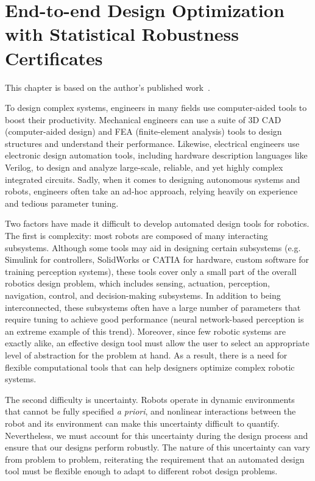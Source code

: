 \chapter{End-to-end Design Optimization with Statistical Robustness Certificates}\label{ch:rss}

This chapter is based on the author's published work~\cite{dawsonCertifiableRobotDesign2022}.

To design complex systems, engineers in many fields use computer-aided tools to boost their productivity. Mechanical engineers can use a suite of 3D CAD (computer-aided design) and FEA (finite-element analysis) tools to design structures and understand their performance. Likewise, electrical engineers use electronic design automation tools, including hardware description languages like Verilog, to design and analyze large-scale, reliable, and yet highly complex integrated circuits. Sadly, when it comes to designing autonomous systems and robots, engineers often take an ad-hoc approach, relying heavily on experience and tedious parameter tuning.

Two factors have made it difficult to develop automated design tools for robotics. The first is complexity: most robots are composed of many interacting subsystems. Although some tools may aid in designing certain subsystems (e.g. Simulink for controllers, SolidWorks or CATIA for hardware, custom software for training perception systems), these tools cover only a small part of the overall robotics design problem, which includes sensing, actuation, perception, navigation, control, and decision-making subsystems. In addition to being interconnected, these subsystems often have a large number of parameters that require tuning to achieve good performance (neural network-based perception is an extreme example of this trend). Moreover, since few robotic systems are exactly alike, an effective design tool must allow the user to select an appropriate level of abstraction for the problem at hand. As a result, there is a need for flexible computational tools that can help designers optimize complex robotic systems.

The second difficulty is uncertainty. Robots operate in dynamic environments that cannot be fully specified \textit{a priori}, and nonlinear interactions between the robot and its environment can make this uncertainty difficult to quantify. Nevertheless, we must account for this uncertainty during the design process and ensure that our designs perform robustly. The nature of this uncertainty can vary from problem to problem, reiterating the requirement that an automated design tool must be flexible enough to adapt to different robot design problems.


